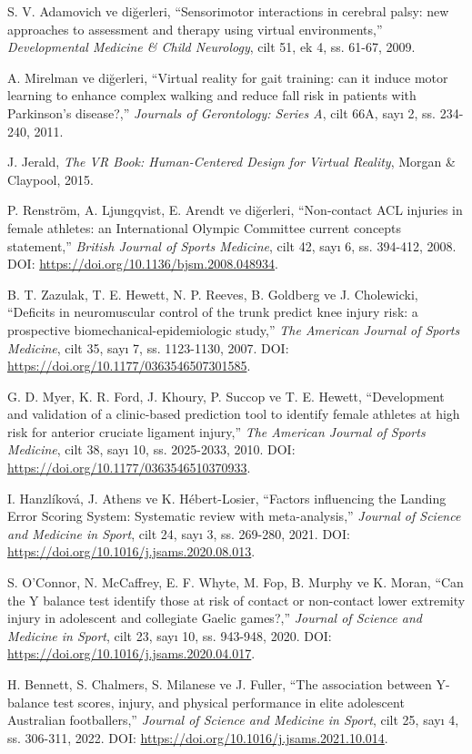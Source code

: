 \documentclass[12pt,a4paper,oneside]{report}
\begin{document}
\begin{enumerate}[label={[\arabic*]}, leftmargin=1.2cm]
\item S. V. Adamovich ve diğerleri, ``Sensorimotor interactions in cerebral palsy: new approaches to assessment and therapy using virtual environments,'' \textit{Developmental Medicine \& Child Neurology}, cilt 51, ek 4, ss. 61-67, 2009.
\item A. Mirelman ve diğerleri, ``Virtual reality for gait training: can it induce motor learning to enhance complex walking and reduce fall risk in patients with Parkinson's disease?,'' \textit{Journals of Gerontology: Series A}, cilt 66A, sayı 2, ss. 234-240, 2011.
\item J. Jerald, \textit{The VR Book: Human-Centered Design for Virtual Reality}, Morgan \& Claypool, 2015.
\item P. Renström, A. Ljungqvist, E. Arendt ve diğerleri, ``Non-contact ACL injuries in female athletes: an International Olympic Committee current concepts statement,'' \textit{British Journal of Sports Medicine}, cilt 42, sayı 6, ss. 394-412, 2008. DOI: \url{https://doi.org/10.1136/bjsm.2008.048934}.
\item B. T. Zazulak, T. E. Hewett, N. P. Reeves, B. Goldberg ve J. Cholewicki, ``Deficits in neuromuscular control of the trunk predict knee injury risk: a prospective biomechanical-epidemiologic study,'' \textit{The American Journal of Sports Medicine}, cilt 35, sayı 7, ss. 1123-1130, 2007. DOI: \url{https://doi.org/10.1177/0363546507301585}.
\item G. D. Myer, K. R. Ford, J. Khoury, P. Succop ve T. E. Hewett, ``Development and validation of a clinic-based prediction tool to identify female athletes at high risk for anterior cruciate ligament injury,'' \textit{The American Journal of Sports Medicine}, cilt 38, sayı 10, ss. 2025-2033, 2010. DOI: \url{https://doi.org/10.1177/0363546510370933}.
\item I. Hanzlíková, J. Athens ve K. Hébert-Losier, ``Factors influencing the Landing Error Scoring System: Systematic review with meta-analysis,'' \textit{Journal of Science and Medicine in Sport}, cilt 24, sayı 3, ss. 269-280, 2021. DOI: \url{https://doi.org/10.1016/j.jsams.2020.08.013}.
\item S. O'Connor, N. McCaffrey, E. F. Whyte, M. Fop, B. Murphy ve K. Moran, ``Can the Y balance test identify those at risk of contact or non-contact lower extremity injury in adolescent and collegiate Gaelic games?,'' \textit{Journal of Science and Medicine in Sport}, cilt 23, sayı 10, ss. 943-948, 2020. DOI: \url{https://doi.org/10.1016/j.jsams.2020.04.017}.
\item H. Bennett, S. Chalmers, S. Milanese ve J. Fuller, ``The association between Y-balance test scores, injury, and physical performance in elite adolescent Australian footballers,'' \textit{Journal of Science and Medicine in Sport}, cilt 25, sayı 4, ss. 306-311, 2022. DOI: \url{https://doi.org/10.1016/j.jsams.2021.10.014}.
\end{enumerate}
\end{document}
